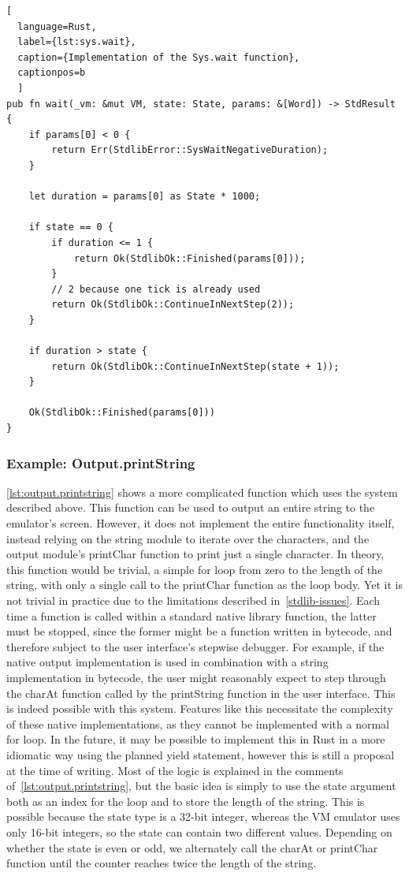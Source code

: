 \begin{lstlisting}[
  language=Rust,
  label={lst:sys.wait},
  caption={Implementation of the Sys.wait function},
  captionpos=b
  ]
pub fn wait(_vm: &mut VM, state: State, params: &[Word]) -> StdResult {
    if params[0] < 0 {
        return Err(StdlibError::SysWaitNegativeDuration);
    }

    let duration = params[0] as State * 1000;

    if state == 0 {
        if duration <= 1 {
            return Ok(StdlibOk::Finished(params[0]));
        }
        // 2 because one tick is already used
        return Ok(StdlibOk::ContinueInNextStep(2));
    }

    if duration > state {
        return Ok(StdlibOk::ContinueInNextStep(state + 1));
    }

    Ok(StdlibOk::Finished(params[0]))
}
\end{lstlisting}

\subsubsection{Example: Output.printString} \label{complex-example}
\cref{lst:output.printstring} shows a more complicated function which uses the system described above. This function can be used to output an entire string to the emulator's screen. However, it does not implement the entire functionality itself, instead relying on the string module to iterate over the characters, and the output module's printChar function to print just a single character.
In theory, this function would be trivial, a simple for loop from zero to the length of the string, with only a single call to the printChar function as the loop body.
Yet it is not trivial in practice due to the limitations described in~\cref{stdlib-issues}.
Each time a function is called within a standard native library function, the latter must be stopped, since the former might be a function written in bytecode, and therefore subject to the user interface's stepwise debugger.
For example, if the native output implementation is used in combination with a string implementation in bytecode, the user might reasonably expect to step through the charAt function called by the printString function in the user interface.
This is indeed possible with this system.
Features like this necessitate the complexity of these native implementations, as they cannot be implemented with a normal for loop.
In the future, it may be possible to implement this in Rust in a more idiomatic way using the planned yield statement, however this is still a proposal at the time of writing.
Most of the logic is explained in the comments of~\cref{lst:output.printstring}, but the basic idea is simply to use the state argument both as an index for the loop and to store the length of the string. This is possible because the state type is a 32-bit integer, whereas the VM emulator uses only 16-bit integers, so the state can contain two different values.
Depending on whether the state is even or odd, we alternately call the charAt or printChar function until the counter reaches twice the length of the string.

